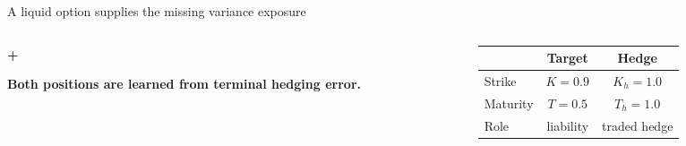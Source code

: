 \begin{frame}{{\fontsize{15}{18}\selectfont A liquid option supplies the missing variance exposure}}
  \vspace{0.12cm}
  \begin{columns}[T,onlytextwidth]
    \begin{column}{0.48\textwidth}
      \centering
      \par
      \vspace{0.24cm}

      \vspace{0.12cm}
      {\color{Slate}\Large\bfseries +}\par
      \vspace{0.12cm}


      \vspace{0.20cm}
      {\small\color{DeepNavy}\bfseries Both positions are learned from terminal hedging error.\par}
    \end{column}

    \begin{column}{0.47\textwidth}
      \vspace{0.08cm}
      \begin{center}
      \renewcommand{\arraystretch}{1.25}
      \small
      \begin{tabular}{@{}lcc@{}}
        \toprule
         & Target & Hedge\\
        \midrule
        Strike & \(K=0.9\) & \(K_h=1.0\)\\
        Maturity & \(T=0.5\) & \(T_h=1.0\)\\
        Role & liability & traded hedge\\
        \bottomrule
      \end{tabular}
      \end{center}


\end{column}
\end{columns}
\end{frame}
